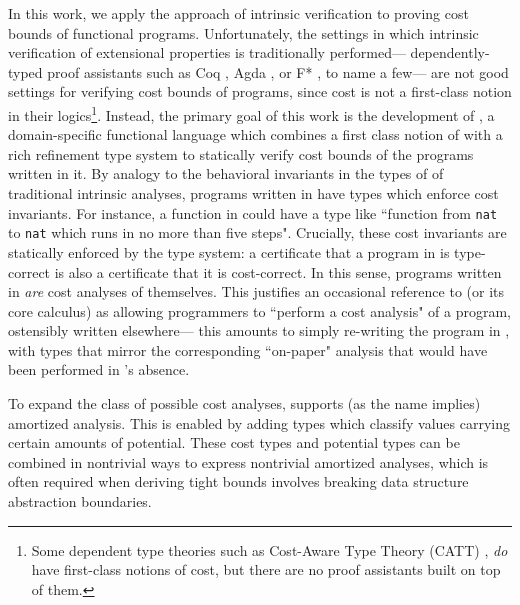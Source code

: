 In this work, we apply the approach of intrinsic verification to proving cost bounds of functional programs. Unfortunately, the settings in which intrinsic verification of extensional properties is traditionally performed--- dependently-typed proof assistants such as Coq \cite{coq}, Agda \cite{norell:afp08}, or F* \cite{swamy-et-al:pldi13}, to name a few--- are not good settings for verifying cost bounds of programs, since cost is not a first-class notion in their logics\footnote{
Some dependent type theories such as Cost-Aware Type Theory (CATT) \cite{niu-harper:catt}, \textit{do} have first-class notions of cost, but there are no proof assistants built on top of them.
}. Instead, the primary goal of this work is the development of \lambdaamorimpl, a domain-specific functional language which combines a first class notion of with a rich refinement type system to statically verify cost bounds of the programs written in it. By analogy to the behavioral invariants in the types of of traditional intrinsic analyses, programs written in \lambdaamor have types which enforce cost invariants. For instance, a function in \lambdaamorimpl could have a type like ``function from \texttt{nat} to \texttt{nat} which runs in no more than five steps". Crucially, these cost invariants are statically enforced by the type system: a certificate that a program in \lambdaamorimpl is type-correct is also a certificate that it is cost-correct. In this sense, programs written in \lambdaamorimpl \textit{are} cost analyses of themselves. This justifies an occasional reference to \lambdaamorimpl (or its core calculus) as allowing programmers to ``perform a cost analysis" of a program, ostensibly written elsewhere--- this amounts to simply re-writing the program in \lambdaamorimpl, with types that mirror the corresponding ``on-paper" analysis that would have been performed in \lambdaamorimpl's absence.

To expand the class of possible cost analyses, \lambdaamorimpl supports (as the name implies) amortized analysis. This is enabled by adding types which classify values carrying certain amounts of potential. These cost types and potential types can be combined in nontrivial ways to express nontrivial amortized analyses, which is often required when deriving tight bounds involves breaking data structure abstraction boundaries.

